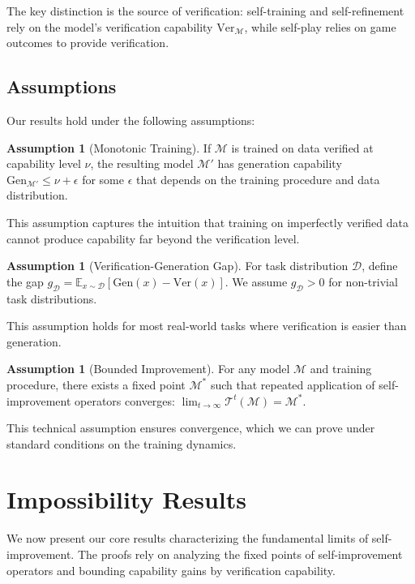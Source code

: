 \documentclass{article}
\theoremstyle{definition}
\newtheorem{assumption}[theorem]{Assumption}
\theoremstyle{remark}
\newcommand{\M}{\mathcal{M}}  %
\newcommand{\D}{\mathcal{D}}  %
\newcommand{\T}{\mathcal{T}}  %
\newcommand{\Gen}{\text{Gen}}  %
\newcommand{\Ver}{\text{Ver}}  %
\newcommand{\E}{\mathbb{E}}    %
\begin{document}
The key distinction is the source of verification: self-training and self-refinement rely on the model's verification capability \(\Ver_\M\), while self-play relies on game outcomes to provide verification.

\subsection{Assumptions}

Our results hold under the following assumptions:

\begin{assumption}[Monotonic Training]
\label{ass:monotonic}
If \(\M\) is trained on data verified at capability level \(\nu\), the resulting model \(\M'\) has generation capability \(\Gen_{\M'} \leq \nu + \epsilon\) for some \(\epsilon\) that depends on the training procedure and data distribution.
\end{assumption}

This assumption captures the intuition that training on imperfectly verified data cannot produce capability far beyond the verification level.

\begin{assumption}[Verification-Generation Gap]
\label{ass:gap}
For task distribution \(\D\), define the gap \(g_\D = \E_{x \sim \D}[\Gen(x) - \Ver(x)]\). We assume \(g_\D > 0\) for non-trivial task distributions.
\end{assumption}

This assumption holds for most real-world tasks where verification is easier than generation.

\begin{assumption}[Bounded Improvement]
\label{ass:bounded}
For any model \(\M\) and training procedure, there exists a fixed point \(\M^*\) such that repeated application of self-improvement operators converges: \(\lim_{t \to \infty} \T^t(\M) = \M^*\).
\end{assumption}

This technical assumption ensures convergence, which we can prove under standard conditions on the training dynamics.

\section{Impossibility Results}
\label{sec:impossibility}

We now present our core results characterizing the fundamental limits of self-improvement. The proofs rely on analyzing the fixed points of self-improvement operators and bounding capability gains by verification capability.
\end{document}
